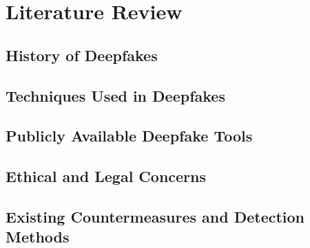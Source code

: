 
\chapter{Literature Review}\label{chapter:literature}

\section{History of Deepfakes}\label{chapter:history}
\section{Techniques Used in Deepfakes}\label{chapter:techniques}
\section{Publicly Available Deepfake Tools}\label{chapter:publicly}
\section{Ethical and Legal Concerns}\label{chapter:legal}
\section{Existing Countermeasures and Detection Methods}\label{chapter:countermeasures}
